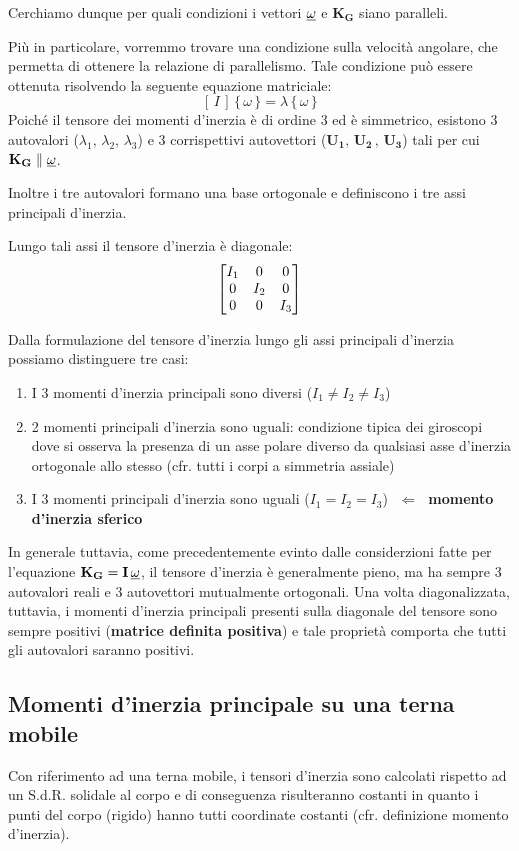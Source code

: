 		Cerchiamo dunque per quali condizioni i vettori $\underline{\omega}$ e $\mathbf{K_G}$ siano paralleli.
		
		Più in particolare, vorremmo trovare una condizione sulla velocità angolare, che permetta di ottenere la relazione di parallelismo. Tale condizione può essere ottenuta risolvendo la seguente equazione matriciale:
		\[[\,I\,]\,\{\,\omega\,\} = \lambda\,\{\,\omega\,\}\]
		Poiché il tensore dei momenti d'inerzia è di ordine 3 ed è simmetrico, esistono 3 autovalori ($\lambda_1,\, \lambda_2,\, \lambda_3$)  e 3 corrispettivi autovettori ($\mathbf{U_1},\, \mathbf{U_2}\, ,\, \mathbf{U_3}$) tali per cui $\mathbf{K_G}\parallel \underline{\omega}$.
		
		Inoltre i tre autovalori formano una base ortogonale e definiscono i tre assi principali d'inerzia.

	Lungo tali assi il tensore d'inerzia è diagonale:
	\[
	\begin{bmatrix}I_1&0&0\\0&I_2&0\\0&0&I_{3}\end{bmatrix}
	\]
	
	Dalla formulazione del tensore d'inerzia lungo gli assi principali d'inerzia possiamo distinguere tre casi:
	\begin{enumerate}
		\item I 3 momenti d'inerzia principali sono diversi ($I_1 \ne I_2 \ne I_3$)
		\item 2 momenti principali d'inerzia sono uguali: condizione tipica dei giroscopi dove si osserva la presenza di un asse polare diverso da qualsiasi asse d'inerzia ortogonale allo stesso (cfr. tutti i corpi a simmetria assiale)
		\item I 3 momenti principali d'inerzia sono uguali ($I_1 = I_2 = I_3$) $\,\,\Longleftarrow\,\,$ \textbf{momento d'inerzia sferico} 
	\end{enumerate}
	
	In generale tuttavia, come precedentemente evinto dalle considerzioni fatte per l'equazione $\mathbf{K_G} = \mathbf{\mathbf{I}}\,\underline{\omega}$, il tensore d'inerzia è generalmente pieno, ma ha sempre 3 autovalori reali e 3 autovettori mutualmente ortogonali. Una volta diagonalizzata, tuttavia, i momenti d'inerzia principali presenti sulla diagonale del tensore sono sempre positivi (\textbf{matrice definita positiva}) e tale proprietà comporta che tutti gli autovalori saranno positivi.
	
	\subsection{Momenti d'inerzia principale su una terna mobile}
	Con riferimento ad una terna mobile, i tensori d'inerzia sono calcolati rispetto ad un S.d.R. solidale al corpo e di conseguenza risulteranno costanti in quanto i punti del corpo (rigido) hanno tutti coordinate costanti (cfr. definizione momento d'inerzia).
	
